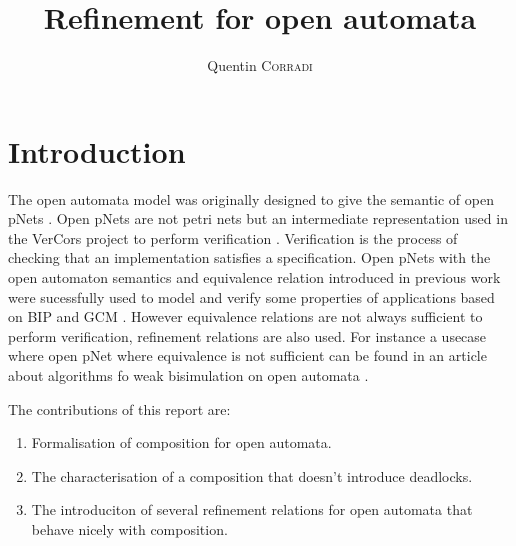\documentclass{article}
\title{Refinement for open automata}
\author{Quentin \textsc{Corradi}}
\begin{document}
\maketitle

\section{Introduction}
The open automata model was originally designed to give the semantic of open pNets \cite{2007.10770}.
Open pNets are not petri nets but an intermediate representation used in the VerCors project to perform verification \cite{henrio:01252323}.
Verification is the process of checking that an implementation satisfies a specification.
Open pNets with the open automaton semantics and equivalence relation introduced in previous work \cite{2007.10770} were sucessfully used to model and verify some properties of applications based on BIP and GCM \cite{qin:01823507, ameurboulifa:01526055} .
However equivalence relations are not always sufficient to perform verification, refinement relations are also used. 
For instance a usecase where open pNet where equivalence is not sufficient can be found in an article about algorithms fo weak bisimulation on open automata \cite{wang:03126313}.

The contributions of this report are:
\begin{enumerate}
\item Formalisation of composition for open automata.
\item The characterisation of a composition that doesn't introduce deadlocks.
\item The introduciton of several refinement relations for open automata that behave nicely with composition.
\end{enumerate}


\end{document}
